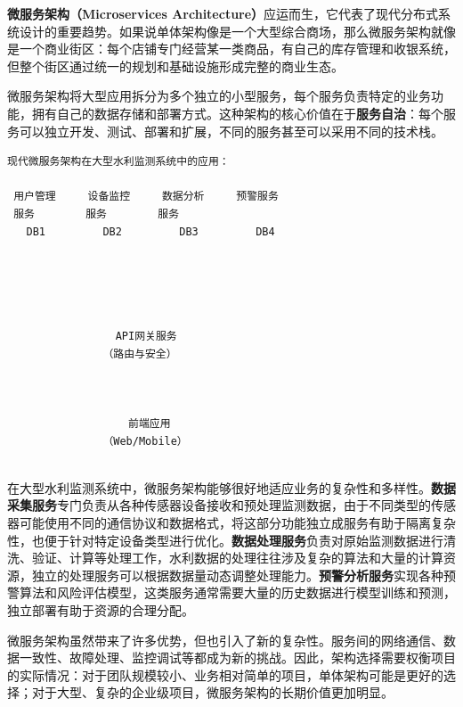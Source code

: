 \textbf{微服务架构（Microservices Architecture）}应运而生，它代表了现代分布式系统设计的重要趋势。如果说单体架构像是一个大型综合商场，那么微服务架构就像是一个商业街区：每个店铺专门经营某一类商品，有自己的库存管理和收银系统，但整个街区通过统一的规划和基础设施形成完整的商业生态。

微服务架构将大型应用拆分为多个独立的小型服务，每个服务负责特定的业务功能，拥有自己的数据存储和部署方式。这种架构的核心价值在于\textbf{服务自治}：每个服务可以独立开发、测试、部署和扩展，不同的服务甚至可以采用不同的技术栈。

\begin{verbatim}
现代微服务架构在大型水利监测系统中的应用：
      
 用户管理     设备监控     数据分析     预警服务  
 服务        服务        服务                 
   DB1         DB2         DB3         DB4    
      
                                          
      
                        
              
                 API网关服务     
               （路由与安全）     
              
                        
              
                   前端应用      
               （Web/Mobile）   
              
\end{verbatim}

在大型水利监测系统中，微服务架构能够很好地适应业务的复杂性和多样性。\textbf{数据采集服务}专门负责从各种传感器设备接收和预处理监测数据，由于不同类型的传感器可能使用不同的通信协议和数据格式，将这部分功能独立成服务有助于隔离复杂性，也便于针对特定设备类型进行优化。\textbf{数据处理服务}负责对原始监测数据进行清洗、验证、计算等处理工作，水利数据的处理往往涉及复杂的算法和大量的计算资源，独立的处理服务可以根据数据量动态调整处理能力。\textbf{预警分析服务}实现各种预警算法和风险评估模型，这类服务通常需要大量的历史数据进行模型训练和预测，独立部署有助于资源的合理分配。

微服务架构虽然带来了许多优势，但也引入了新的复杂性。服务间的网络通信、数据一致性、故障处理、监控调试等都成为新的挑战。因此，架构选择需要权衡项目的实际情况：对于团队规模较小、业务相对简单的项目，单体架构可能是更好的选择；对于大型、复杂的企业级项目，微服务架构的长期价值更加明显。

